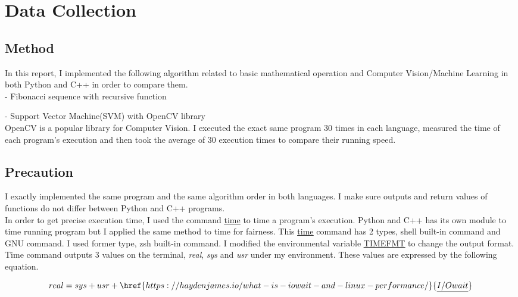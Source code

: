 \documentclass[11pt, a4paper]{article}
\begin{document}
\section{Data Collection}
\subsection{Method}
In this report, I implemented the following algorithm related to basic mathematical operation and Computer Vision/Machine Learning in both Python and C++ in order to compare them.\\

- Fibonacci sequence with recursive function 



- Support Vector Machine(SVM) with OpenCV library\\

OpenCV is a popular library for Computer Vision. I executed the exact same program 30 times in each language, measured the time of each program's execution and then took the average of 30 execution times to compare their running speed.

\subsection{Precaution}
I exactly implemented the same program and the same algorithm order in both languages. I make sure outputs and return values of functions do not differ between Python and C++ programs.\\

In order to get precise execution time, I used the command \href{https://en.wikipedia.org/wiki/Time_(Unix)}{\underline{time}} to time a program's execution. Python and C++ has its own module to time running program but I applied the same method to time for fairness. This \href{https://linuxize.com/post/linux-time-command/}{\underline{time}} command has 2 types, shell built-in command and GNU command. I used former type, zsh built-in command. I modified the environmental variable \href{https://unix.stackexchange.com/questions/453338/how-to-get-execution-millisecond-time-of-a-command-in-zsh}{\underline{TIMEFMT}} to change the output format. Time command outputs 3 values on the terminal, {\it real}, {\it sys}  and {\it usr} under my environment. These values are expressed by the following equation. 

\begin{equation}
real = sys + usr + \href{https://haydenjames.io/what-is-iowait-and-linux-performance/}{\underline{I/Owait}}
\end{equation}
\end{document}
